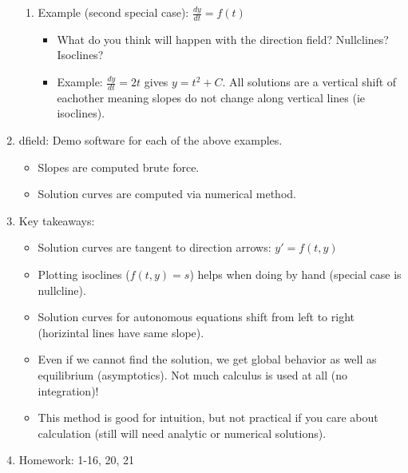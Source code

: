 \documentclass{article}
\newcommand{\ds}{\displaystyle}
\begin{document}
\begin{enumerate}
\begin{enumerate}
\item Example (second special case): $\ds \frac{dy}{dt} = f(t)$
\begin{itemize}
\item What do you think will happen with the direction field? Nullclines? Isoclines?
\item Example: $\ds \frac{dy}{dt}=2t$ gives $y=t^2+C$. All solutions are a vertical shift of eachother meaning slopes do not change along vertical lines (ie isoclines). 
\end{itemize}

\end{enumerate}

\item dfield: Demo software for each of the above examples. 
\begin{itemize}
\item Slopes are computed brute force.
\item Solution curves are computed via numerical method.
\end{itemize}

\item Key takeaways:
\begin{itemize}
\item Solution curves are tangent to direction arrows: $y'=f(t,y)$
\item Plotting isoclines ($f(t,y)=s$) helps when doing by hand (special case is nullcline).
\item Solution curves for autonomous equations shift from left to right (horizintal lines have same slope). 
\item Even if we cannot find the solution, we get global behavior as well as equilibrium (asymptotics). Not much calculus is used at all (no integration)!
\item This method is good for intuition, but not practical if you care about calculation (still will need analytic or numerical solutions).
\end{itemize}

\item Homework: 1-16, 20, 21

\end{enumerate}



\end{document}
